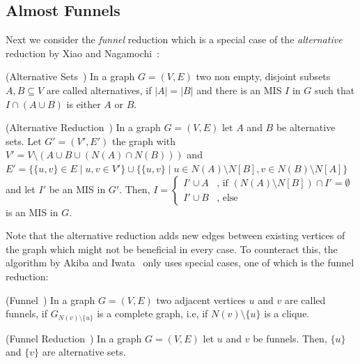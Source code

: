 \documentclass[a4paper,UKenglish,cleveref, autoref, thm-restate]{lipics-v2021}
\begin{document}
\subsection{Almost Funnels}
\label{sec:almost_funnels}

Next we consider the \emph{funnel} reduction which is a special case of the
\emph{alternative} reduction by Xiao and Nagamochi~\cite{XiaoUnconfined}:

\begin{definition} (Alternative Sets~\cite{XiaoUnconfined})
	In a graph $G=(V,E)$ two non empty, disjoint subsets $A,B\subseteq V$ are
    called alternatives, if $|A| = |B|$ and there is an MIS $I$ in $G$ such that $I\cap(A\cup B)$ is either $A$ or $B$.
\end{definition}

\begin{theorem} (Alternative Reduction~\cite{XiaoUnconfined})
	In a graph $G=(V,E)$ let $A$ and $B$ be alternative sets. Let $G'=(V', E')$
    the graph with $V' = V\setminus(A\cup B\cup (N(A)\cap N(B)))$ and $E' =
    \{\{u,v\} \in E \mid u,v \in V'\} \cup \{ \{u,v\}\;|\; u\in
    N(A)\setminus N[B], v\in N(B)\setminus N[A] \}$ and let $I'$ be an MIS in $G'$. Then,
	$
    I=\begin{cases}
      I'\cup A & \text{, if } (N(A)\setminus N[B]) \cap I' = \emptyset%
      \\
      I'\cup B & \text{, else}
	\end{cases}
    $
	is an MIS in $G$.
\end{theorem}

Note that the alternative reduction adds new edges between existing
vertices of the graph which might not be beneficial in every case. To counteract this, the algorithm
by Akiba and Iwata~\cite{AkibaIwata} only uses special cases, one of which is
the funnel reduction:

\begin{definition} (Funnel~\cite{XiaoUnconfined})
	In a graph $G=(V,E)$ two adjacent vertices $u$ and $v$ are called funnels, if $G_{N(v)\setminus\{u\}}$ is a complete graph, i.e, if $N(v)\setminus\{u\}$ is a clique.
\end{definition}
\begin{theorem} (Funnel Reduction~\cite{XiaoUnconfined}) In a graph $G=(V,E)$ let $u$ and $v$ be funnels. Then, $\{u\}$ and $\{v\}$ are alternative sets.	
\end{theorem}
\end{document}
